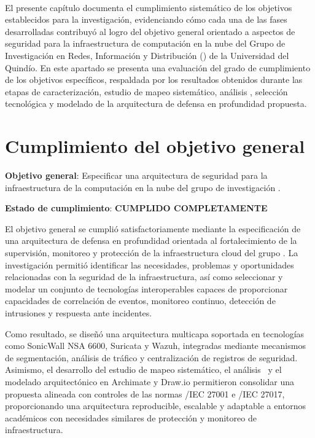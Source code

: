 \label{cap:cumplimiento-objetivos}
\mbox{}\\

El presente capítulo documenta el cumplimiento sistemático de los objetivos establecidos para la investigación, evidenciando cómo cada una 
de las fases desarrolladas contribuyó al logro del objetivo general orientado a aspectos de seguridad para la infraestructura de 
computación en la nube del Grupo de Investigación en Redes, Información y Distribución (\GRID) de la Universidad del Quindío. En este
apartado se presenta una evaluación del grado de cumplimiento de los objetivos específicos, respaldada por los resultados obtenidos 
durante las etapas de caracterización, estudio de mapeo sistemático, análisis \DAR, selección tecnológica y modelado de la arquitectura de 
defensa en profundidad propuesta.

\section{Cumplimiento del objetivo general}
\noindent

\textbf{Objetivo general}: Especificar una arquitectura de seguridad para la infraestructura de la computación en la
nube del grupo de investigación \GRID.

\textbf{Estado de cumplimiento}: \textbf{CUMPLIDO COMPLETAMENTE}

El objetivo general se cumplió satisfactoriamente mediante la especificación de una arquitectura de defensa en profundidad orientada al 
fortalecimiento de la supervisión, monitoreo y protección de la infraestructura cloud del grupo \GRID. La investigación permitió 
identificar las necesidades, problemas y oportunidades relacionadas con la seguridad de la infraestructura, así como seleccionar y modelar 
un conjunto de tecnologías interoperables capaces de proporcionar capacidades de correlación de eventos, monitoreo continuo, detección de 
intrusiones y respuesta ante incidentes.

Como resultado, se diseñó una arquitectura multicapa soportada en tecnologías como SonicWall NSA 6600, Suricata y Wazuh, integradas 
mediante mecanismos de segmentación, análisis de tráfico y centralización de registros de seguridad. Asimismo, el desarrollo del estudio de 
mapeo sistemático, el análisis \DAR\ y el modelado arquitectónico en Archimate y Draw.io permitieron consolidar una propuesta alineada con 
controles de las normas \ISO/IEC 27001 e \ISO/IEC 27017, proporcionando una arquitectura reproducible, escalable y adaptable a entornos 
académicos con necesidades similares de protección y monitoreo de infraestructura.

